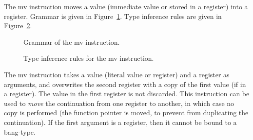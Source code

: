 The {\Iformat mv} instruction moves a value (immediate value or stored in a register) into a register.
Grammar is given in Figure~\ref{fig:nstar-instructionset-registers-mv-grammar}.
Type inference rules are given in Figure~\ref{fig:nstar-instructionset-registers-mv-typerules}.

\begin{figure}[H]
	\centering


	\caption{Grammar of the {\Iformat mv} instruction.}
	\label{fig:nstar-instructionset-registers-mv-grammar}
\end{figure}

\begin{figure}[H]
	\centering


	\caption{Type inference rules for the {\Iformat mv} instruction.}
	\label{fig:nstar-instructionset-registers-mv-typerules}
\end{figure}

The {\Iformat mv} instruction takes a value (literal value or register) and a register as arguments, and overwrites the second register with a copy of the first value (if in a register).
The value in the first register is not discarded.
This instruction can be used to \textit{move} the continuation from one register to another, in which case no copy is performed (the function pointer is moved, to prevent from duplicating the continuation).
If the first argument is a register, then it cannot be bound to a bang-type.

